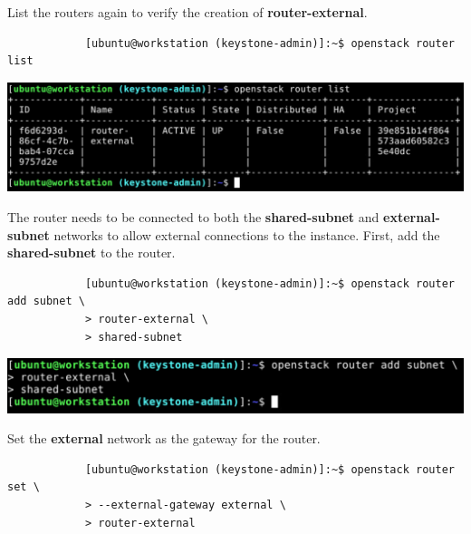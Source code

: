 \documentclass[letterpaper, 12pt]{article}
\begin{document}
\begin{enumerate}
    \begin{labstep}
        List the routers again to verify the creation of \textbf{router-external}.
        \begin{lstlisting}
            [ubuntu@workstation (keystone-admin)]:~$ openstack router list
        \end{lstlisting}

        \begin{center}
            \includegraphics[width=\linewidth]{images/part9/step15.png}
        \end{center}
    \end{labstep}

    \begin{labstep}
        The router needs to be connected to both the \textbf{shared-subnet} and \textbf{external-subnet} networks to allow external connections to the instance.
        First, add the \textbf{shared-subnet} to the router.
        \begin{lstlisting}
            [ubuntu@workstation (keystone-admin)]:~$ openstack router add subnet \
            > router-external \
            > shared-subnet
        \end{lstlisting}

        \begin{center}
            \includegraphics[width=\linewidth]{images/part9/step16.png}
        \end{center}
    \end{labstep}

    \begin{labstep}
        Set the \textbf{external} network as the gateway for the router.
        \begin{lstlisting}
            [ubuntu@workstation (keystone-admin)]:~$ openstack router set \
            > --external-gateway external \
            > router-external
        \end{lstlisting}


\end{labstep}
\end{enumerate}
\end{document}
